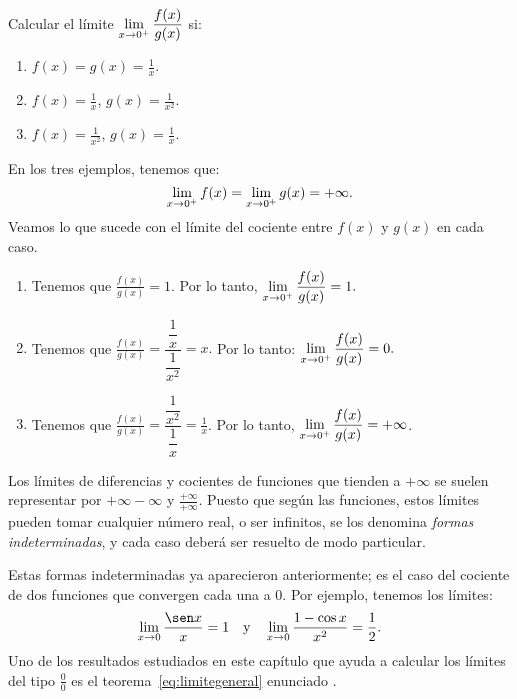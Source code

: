 \begin{exemplo}[Solución]{%
Calcular el límite $\displaystyle\limjc{\frac{f(x)}{g(x)}}{x}{0^+}$ si:
\begin{multicols}{3}
\begin{enumerate}
\item $f(x) = g(x) = \displaystyle\frac{1}{x}$.
\item $f(x) = \displaystyle\frac{1}{x}$, $g(x) = \displaystyle\frac{1}{x^2}$.
\item $f(x) = \displaystyle\frac{1}{x^2}$, $g(x) = \displaystyle\frac{1}{x}$.
\end{enumerate}
\end{multicols}
}%
En los tres ejemplos, tenemos que:
\[
\limjc{f(x)}{x}{0^+} = \limjc{g(x)}{x}{0^+} = +\infty.
\]
Veamos lo que sucede con el límite del cociente entre $f(x)$ y $g(x)$ en cada caso.
\begin{enumerate}[leftmargin=*]
\item Tenemos que $\displaystyle\frac{f(x)}{g(x)} = 1$. Por lo tanto,
    $\displaystyle\limjc{\frac{f(x)}{g(x)}}{x}{0^+} = 1.$

\item Tenemos que $\displaystyle\frac{f(x)}{g(x)} = \dfrac{\dfrac{1}{x}}{\dfrac{1}{x^2}} = x.$
    Por lo tanto: $\displaystyle\limjc{\frac{f(x)}{g(x)}}{x}{0^+} = 0.$

\item Tenemos que $\displaystyle\frac{f(x)}{g(x)} = \dfrac{\dfrac{1}{x^2}}{\dfrac{1}{x}} =
    \frac{1}{x}$. Por lo tanto, $\displaystyle\limjc{\frac{f(x)}{g(x)}}{x}{0^+} = +\infty$.
\end{enumerate}
\end{exemplo}

Los límites de diferencias y cocientes de funciones que tienden a $+\infty$ se suelen representar
por $+\infty - \infty$ y $\frac{+\infty}{+\infty}$. Puesto que según las funciones, estos límites
pueden tomar cualquier número real, o ser infinitos, se los denomina \emph{formas indeterminadas},
y cada caso deberá ser resuelto de modo particular.

Estas formas indeterminadas ya aparecieron anteriormente; es el caso del cociente de dos funciones
que convergen cada una a $0$. Por ejemplo, tenemos los límites:
\[
\limjc{\frac{\sen x}{x}}{x}{0} = 1 \yjc \limjc{\frac{1 - \cos x}{x^2}}{x}{0} = \frac{1}{2}.
\]
Uno de los resultados estudiados en este capítulo que ayuda a calcular los límites del tipo
$\frac{0}{0}$ es el teorema~\ref{eq:limitegeneral} enunciado .


